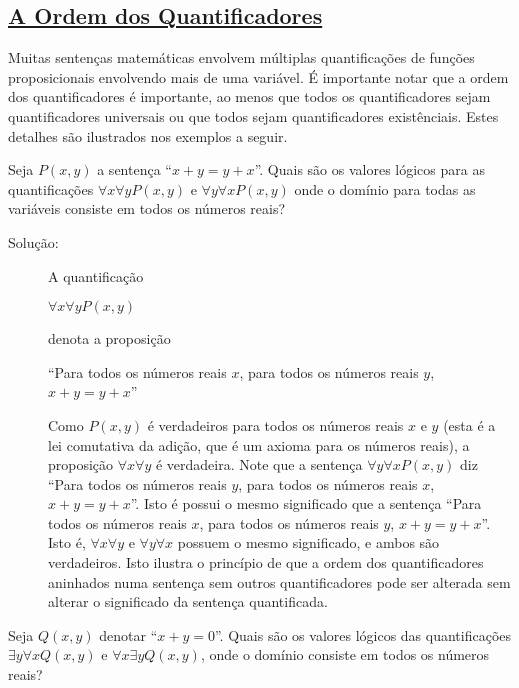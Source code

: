 \subsection*{\underline{A Ordem dos Quantificadores}}

Muitas sentenças matemáticas envolvem múltiplas quantificações de funções
proposicionais envolvendo mais de uma variável. É importante notar que a ordem
dos quantificadores é importante, ao menos que todos os quantificadores sejam
quantificadores universais ou que todos sejam quantificadores existênciais.
Estes detalhes são ilustrados nos exemplos a seguir.

\begin{exmp}
\label{exem150}
Seja $P(x,y)$ a sentença ``$x+y=y+x$''. Quais são os valores lógicos para as
quantificações $\forall x\forall yP(x,y)$ e $\forall y\forall xP(x,y)$ onde o
domínio para todas as variáveis consiste em todos os números reais?
\begin{description}
\item[Solução:]A quantificação
\begin{center}
$\forall x\forall yP(x,y)$
\end{center}
denota a proposição
\begin{center}
``Para todos os números reais $x$, para todos os números reais $y$, $x+y=y+x$''
\end{center}
Como $P(x,y)$ é verdadeiros para todos os números reais $x$ e $y$ (esta é a lei
comutativa da adição, que é um axioma para os números reais), a proposição
$\forall x\forall y$ é verdadeira. Note que a sentença $\forall y\forall
xP(x,y)$ diz ``Para todos os números reais $y$, para todos os números reais $x$,
$x+y=y+x$''. Isto é possui o mesmo significado que a sentença ``Para todos os
números reais $x$, para todos os números reais $y$, $x+y=y+x$''. Isto é,
$\forall x\forall y$ e $\forall y\forall x$ possuem o mesmo significado, e ambos
são verdadeiros. Isto ilustra o princípio de que a ordem dos quantificadores
aninhados numa sentença sem outros quantificadores pode ser alterada sem alterar
o significado da sentença quantificada.
\end{description}
\end{exmp}


\begin{exmp}
\label{exem151}
Seja $Q(x,y)$ denotar ``$x+y=0$''. Quais são os valores lógicos das
quantificações $\exists y\forall xQ(x,y)$ e $\forall x\exists yQ(x,y)$, onde o
domínio consiste em todos os números reais?
\end{exmp}

